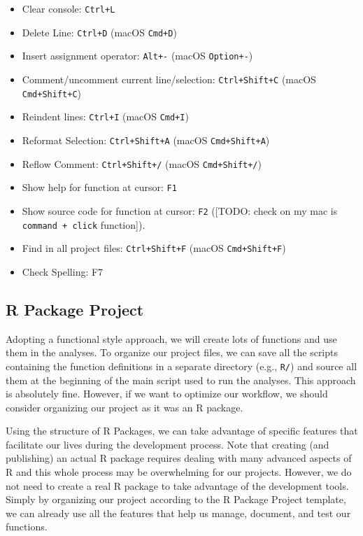 \documentclass[
  11pt,
]{book}
\providecommand{\tightlist}{%
  \setlength{\itemsep}{0pt}\setlength{\parskip}{0pt}}
\begin{document}
\begin{itemize}
  \begin{itemize}
  \tightlist
  \item
    Clear console: \texttt{Ctrl+L}
  \item
    Delete Line: \texttt{Ctrl+D} (macOS \texttt{Cmd+D})
  \item
    Insert assignment operator: \texttt{Alt+-} (macOS \texttt{Option+-})
  \item
    Comment/uncomment current line/selection: \texttt{Ctrl+Shift+C} (macOS \texttt{Cmd+Shift+C})
  \item
    Reindent lines: \texttt{Ctrl+I} (macOS \texttt{Cmd+I})
  \item
    Reformat Selection: \texttt{Ctrl+Shift+A} (macOS \texttt{Cmd+Shift+A})
  \item
    Reflow Comment: \texttt{Ctrl+Shift+/} (macOS \texttt{Cmd+Shift+/})
  \item
    Show help for function at cursor: \texttt{F1}
  \item
    Show source code for function at cursor: \texttt{F2} ({[}TODO: check on my mac is \texttt{command\ +\ click} function{]}).
  \item
    Find in all project files: \texttt{Ctrl+Shift+F} (macOS \texttt{Cmd+Shift+F})
  \item
    Check Spelling: F7
  \end{itemize}
\end{itemize}

\hypertarget{r-package}{%
\subsection{R Package Project}\label{r-package}}

Adopting a functional style approach, we will create lots of functions and use them in the analyses. To organize our project files, we can save all the scripts containing the function definitions in a separate directory (e.g., \texttt{R/}) and source all them at the beginning of the main script used to run the analyses. This approach is absolutely fine. However, if we want to optimize our workflow, we should consider organizing our project as it was an R package.

Using the structure of R Packages, we can take advantage of specific features that facilitate our lives during the development process. Note that creating (and publishing) an actual R package requires dealing with many advanced aspects of R and this whole process may be overwhelming for our projects. However, we do not need to create a real R package to take advantage of the development tools. Simply by organizing our project according to the R Package Project template, we can already use all the features that help us manage, document, and test our functions.
\end{document}
